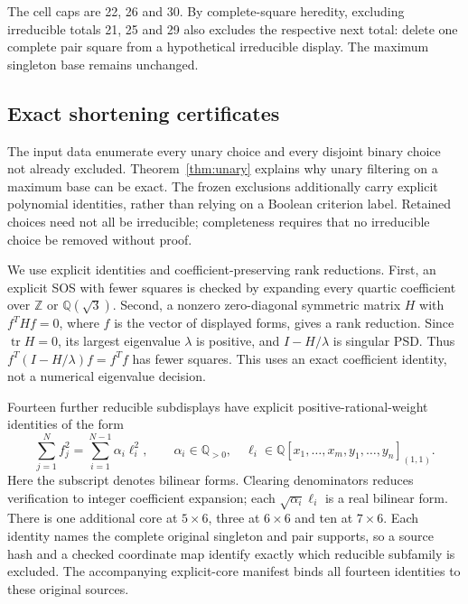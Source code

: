 \documentclass[11pt,a4paper]{article}
\theoremstyle{definition}
\newcommand{\Q}{\mathbb Q}
\newcommand{\Z}{\mathbb Z}
\begin{document}
The cell caps are 22, 26 and 30. By complete-square heredity, excluding
irreducible totals 21, 25 and 29 also excludes the respective next total:
delete one complete pair square from a hypothetical irreducible display.
The maximum singleton base remains unchanged.

\subsection{Exact shortening certificates}

The input data enumerate every unary choice and every disjoint binary
choice not already excluded. Theorem~\ref{thm:unary} explains why unary
filtering on a maximum base can be exact. The frozen exclusions additionally
carry explicit polynomial identities, rather than relying on a Boolean
criterion label. Retained choices need not all be irreducible; completeness
requires that no irreducible choice be removed without proof.

We use explicit identities and coefficient-preserving rank reductions. First, an explicit SOS with fewer
squares is checked by expanding every quartic coefficient over $\Z$ or
$\Q(\sqrt3)$. Second, a nonzero zero-diagonal symmetric matrix $H$ with
$f^THf=0$, where $f$ is the vector of displayed forms, gives a rank
reduction. Since $\operatorname{tr}H=0$, its largest eigenvalue
$\lambda$ is positive, and $I-H/\lambda$ is singular PSD. Thus
$f^T(I-H/\lambda)f=f^Tf$ has fewer squares. This uses an exact
coefficient identity, not a numerical eigenvalue decision.

Fourteen further reducible subdisplays have explicit positive-rational-weight
identities of the form
\begin{equation}\label{eq:weightedidentity}
 \sum_{j=1}^{N}f_j^2=\sum_{i=1}^{N-1}\alpha_i\ell_i^2,
 \qquad \alpha_i\in\Q_{>0},\quad
 \ell_i\in\Q[x_1,\ldots,x_m,y_1,\ldots,y_n]_{(1,1)}.
\end{equation}
Here the subscript denotes bilinear forms. Clearing denominators reduces
verification to integer coefficient expansion; each
$\sqrt{\alpha_i}\ell_i$ is a real bilinear form. There is one additional
core at $5\times6$, three at $6\times6$ and ten at $7\times6$.
Each identity names the complete original singleton and pair supports,
so a source hash and a checked coordinate map identify exactly which
reducible subfamily is excluded. The accompanying explicit-core manifest
binds all fourteen identities to these original sources.
\end{document}
